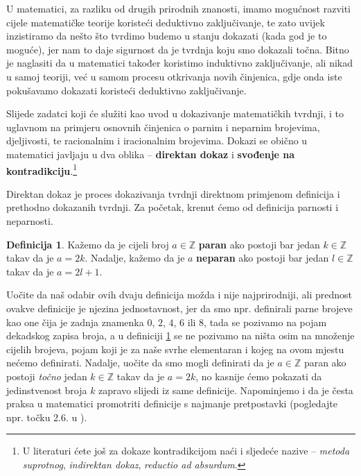 \documentclass{book}
\theoremstyle{definition}
\theoremstyle{definition}
\newtheorem{definition}{Definicija}
\theoremstyle{remark}
\begin{document}
U matematici, za razliku od drugih prirodnih znanosti, imamo mogućnost razviti cijele matematičke teorije koristeći deduktivno zaključivanje, te zato uvijek inzistiramo da nešto što tvrdimo budemo u stanju dokazati (kada god je to moguće), jer nam to daje sigurnost da je tvrdnja koju smo dokazali točna. Bitno je naglasiti da u matematici također koristimo induktivno zaključivanje, ali nikad u samoj teoriji, već u samom procesu otkrivanja novih činjenica, gdje onda iste pokušavamo dokazati koristeći deduktivno zaključivanje. 

Slijede zadatci koji će služiti kao uvod u dokazivanje matematičkih tvrdnji, i to uglavnom na primjeru osnovnih činjenica o parnim i neparnim brojevima, djeljivosti, te racionalnim i iracionalnim brojevima. Dokazi se obično u matematici javljaju u dva oblika -- \textbf{direktan dokaz} i \textbf{svođenje na kontradikciju}.\footnote{U literaturi ćete još za dokaze kontradikcijom naći i sljedeće nazive -- \textit{metoda suprotnog}, \textit{indirektan dokaz}, \textit{reductio ad absurdum}.}

Direktan dokaz je proces dokazivanja tvrdnji direktnom primjenom definicija i prethodno dokazanih tvrdnji. Za početak, krenut ćemo od definicija parnosti i neparnosti.

\begin{definition}
\label{15}
Kažemo da je cijeli broj $a\in \mathbb{Z}$ \textbf{paran} ako postoji bar jedan $k\in \mathbb{Z}$ takav da je $a=2k$. Nadalje, kažemo da je $a$ \textbf{neparan} ako postoji bar jedan $l\in \mathbb{Z}$ takav da je $a=2l+1$.
\end{definition}

Uočite da naš odabir ovih dvaju definicija možda i nije najprirodniji, ali prednost ovakve definicije je njezina jednostavnost, jer da smo npr. definirali parne brojeve kao one čija je zadnja znamenka $0$, $2$, $4$, $6$ ili $8$, tada se pozivamo na pojam dekadskog zapisa broja, a u definiciji \ref{15} se ne pozivamo na ništa osim na množenje cijelih brojeva, pojam koji je za naše svrhe elementaran i kojeg na ovom mjestu nećemo definirati. Nadalje, uočite da smo mogli definirati da je $a\in \mathbb{Z}$ paran ako postoji \textit{točno} jedan $k\in \mathbb{Z}$ takav da je $a=2k$, no kasnije ćemo pokazati da jedinstvenost broja $k$ zapravo slijedi iz same definicije. Napominjemo i da je česta praksa u matematici promotriti definicije s najmanje pretpostavki (pogledajte npr. točku 2.6. u \cite{2}).
\end{document}
